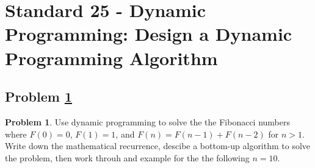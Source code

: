 \documentclass[11pt]{article}
\theoremstyle{definition}
\theoremstyle{definition}
\newtheorem{required}{Problem}
\theoremstyle{definition}
\begin{document}
\section{Standard 25 - Dynamic Programming: Design a Dynamic Programming Algorithm}
\subsection{Problem \ref{prob}}\begin{required}\label{prob}
Use dynamic programming to solve the the Fibonacci numbers where $F(0) = 0$, $F(1) = 1$, and $F(n) = F(n - 1) + F(n - 2)$ for $n > 1$.  Write down the mathematical recurrence, descibe a bottom-up algorithm to solve the problem, then work throuh and example for the the following $n=10$.


\end{required}

\end{document}
